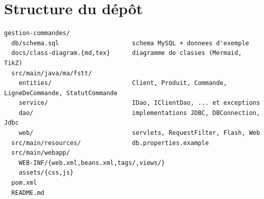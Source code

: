 \documentclass[11pt,a4paper]{report}
\begin{document}
\chapter{Structure du d\'ep\^ot}
\begin{lstlisting}[basicstyle=\ttfamily\footnotesize,numbers=none,xleftmargin=0pt,framexleftmargin=0pt,caption={Arborescence principale}]
gestion-commandes/
  db/schema.sql                    schema MySQL + donnees d'exemple
  docs/class-diagram.{md,tex}      diagramme de classes (Mermaid, TikZ)
  src/main/java/ma/fstt/
    entities/                      Client, Produit, Commande, LigneDeCommande, StatutCommande
    service/                       IDao, IClientDao, ... et exceptions
    dao/                           implementations JDBC, DBConnection, Jdbc
    web/                           servlets, RequestFilter, Flash, Web
  src/main/resources/              db.properties.example
  src/main/webapp/
    WEB-INF/{web.xml,beans.xml,tags/,views/}
    assets/{css,js}
  pom.xml
  README.md
\end{lstlisting}
\end{document}

